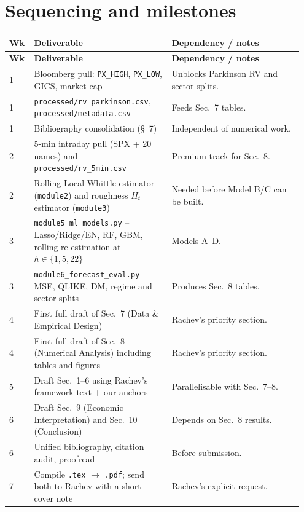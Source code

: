 \documentclass[11pt,a4paper]{article}
\begin{document}
\section{Sequencing and milestones}

\begin{longtable}{@{}p{0.07\linewidth}p{0.45\linewidth}p{0.43\linewidth}@{}}
\toprule
\textbf{Wk} & \textbf{Deliverable} & \textbf{Dependency / notes} \\
\midrule
\endfirsthead
\toprule
\textbf{Wk} & \textbf{Deliverable} & \textbf{Dependency / notes} \\
\midrule
\endhead
1 & Bloomberg pull: \texttt{PX\_HIGH}, \texttt{PX\_LOW}, GICS, market cap &
Unblocks Parkinson RV and sector splits. \\
1 & \texttt{processed/rv\_parkinson.csv}, \texttt{processed/metadata.csv} &
Feeds Sec.\ 7 tables. \\
1 & Bibliography consolidation (\S~7) & Independent of numerical work. \\
2 & 5-min intraday pull (SPX + 20 names) and
\texttt{processed/rv\_5min.csv} & Premium track for Sec.\ 8. \\
2 & Rolling Local Whittle estimator (\texttt{module2}) and roughness
$H_t$ estimator (\texttt{module3}) &
Needed before Model B/C can be built. \\
3 & \texttt{module5\_ml\_models.py} -- Lasso/Ridge/EN, RF, GBM, rolling
re-estimation at $h\in\{1,5,22\}$ & Models A--D. \\
3 & \texttt{module6\_forecast\_eval.py} -- MSE, QLIKE, DM, regime and
sector splits & Produces Sec.\ 8 tables. \\
4 & First full draft of Sec.\ 7 (Data \& Empirical Design) & Rachev's
priority section. \\
4 & First full draft of Sec.\ 8 (Numerical Analysis) including tables and
figures & Rachev's priority section. \\
5 & Draft Sec.\ 1--6 using Rachev's framework text + our anchors &
Parallelisable with Sec.\ 7--8. \\
6 & Draft Sec.\ 9 (Economic Interpretation) and Sec.\ 10 (Conclusion) &
Depends on Sec.\ 8 results. \\
6 & Unified bibliography, citation audit, proofread & Before submission. \\
7 & Compile \texttt{.tex} $\to$ \texttt{.pdf}; send both to Rachev with a
short cover note & Rachev's explicit request. \\
\bottomrule
\end{longtable}
\end{document}
